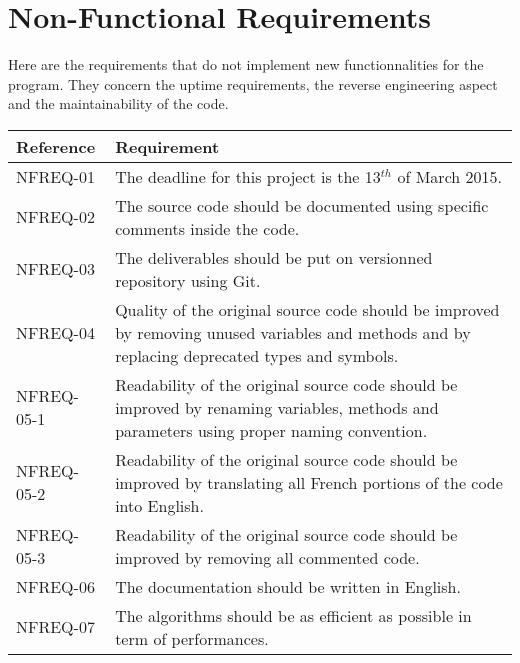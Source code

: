 \section{Non-Functional Requirements}
Here are the requirements that do not implement new functionnalities for the program. They concern the uptime requirements, the reverse engineering aspect and the maintainability of the code.
\begin{flushleft}
    \begin{tabular}{ | p{} |  p{} |}
    \hline
   	\textbf{Reference} & \textbf{Requirement}
    \\
    \hline
	NFREQ-01 & The deadline for this project is the 13$^{th}$ of March 2015.
    \\
    \hline
	NFREQ-02 & The source code should be documented using specific comments inside the code.
    \\
    \hline
    NFREQ-03 & The deliverables should be put on versionned repository using Git.
    \\
    \hline
    NFREQ-04 & Quality of the original source code should be improved by removing unused variables and methods and by replacing deprecated types and symbols.
    \\
    \hline
    NFREQ-05-1 & Readability of the original source code should be improved by renaming variables, methods and parameters using proper naming convention.
    \\
    \hline
    NFREQ-05-2 & Readability of the original source code should be improved by translating all French portions of the code into English.
    \\
    \hline
    NFREQ-05-3 & Readability of the original source code should be improved by removing all commented code.
    \\
    \hline
    NFREQ-06 & The documentation should be written in English.
    \\
    \hline
    NFREQ-07 & The algorithms should be as efficient as possible in term of performances.
    \\
    \hline
    \end{tabular}
\end{flushleft}
